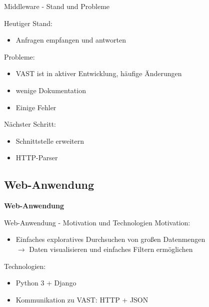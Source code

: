 \documentclass[9pt]{beamer}
\begin{document}
\begin{frame}{Middleware - Stand und Probleme}{}

	Heutiger Stand:
	\begin{itemize}
		\item Anfragen empfangen und antworten
	\end{itemize}

	Probleme:
	\begin{itemize}
		\item VAST ist in aktiver Entwicklung, häufige Änderungen
		\item wenige Dokumentation
		\item Einige Fehler
	\end{itemize}
	
	Nächster Schritt:
	\begin{itemize}
		\item Schnittstelle erweitern
		\item HTTP-Parser
	\end{itemize}

\end{frame}

\subsection{Web-Anwendung}

	\begin{frame}{}
		\begin{center}
			\LARGE \textbf{Web-Anwendung}
		\end{center}
	\end{frame}

\begin{frame}{Web-Anwendung - Motivation und Technologien}{}
	Motivation:
	\begin{itemize}
		\item Einfaches exploratives Durchsuchen von großen Datenmengen\\
			$\rightarrow$ Daten visualisieren und einfaches Filtern ermöglichen
	\end{itemize}
	Technologien:
	\begin{itemize}
		\item Python 3 + Django
		\item Kommunikation zu VAST: HTTP + JSON
	\end{itemize}
\end{frame}
\end{document}
